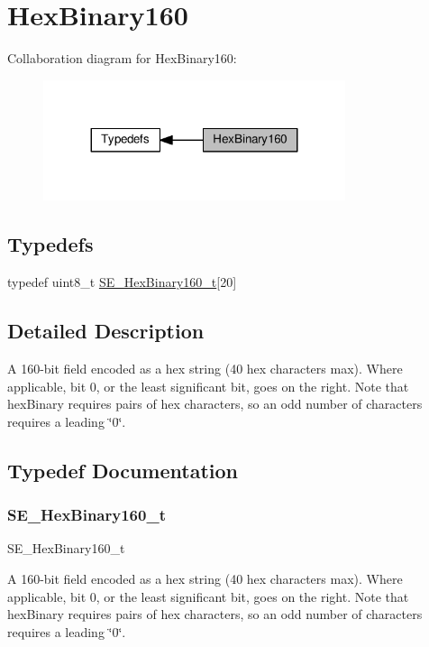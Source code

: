 \hypertarget{group__HexBinary160}{}\section{Hex\+Binary160}
\label{group__HexBinary160}
Collaboration diagram for Hex\+Binary160\+:\nopagebreak
\begin{figure}[H]
\begin{center}
\leavevmode
\includegraphics[width=251pt]{group__HexBinary160}
\end{center}
\end{figure}
\subsection*{Typedefs}
\begin{DoxyCompactItemize}
\item 
typedef uint8\+\_\+t \hyperlink{group__HexBinary160_ga92b92aa55555bdb75f3a59060f2c1632}{S\+E\+\_\+\+Hex\+Binary160\+\_\+t}\mbox{[}20\mbox{]}
\end{DoxyCompactItemize}


\subsection{Detailed Description}
A 160-\/bit field encoded as a hex string (40 hex characters max). Where applicable, bit 0, or the least significant bit, goes on the right. Note that hex\+Binary requires pairs of hex characters, so an odd number of characters requires a leading \char`\"{}0\char`\"{}. 

\subsection{Typedef Documentation}
\mbox{\label{group__HexBinary160_ga92b92aa55555bdb75f3a59060f2c1632}} 
\subsubsection{\texorpdfstring{S\+E\+\_\+\+Hex\+Binary160\+\_\+t}{SE\_HexBinary160\_t}}
{\footnotesize\ttfamily S\+E\+\_\+\+Hex\+Binary160\+\_\+t}

A 160-\/bit field encoded as a hex string (40 hex characters max). Where applicable, bit 0, or the least significant bit, goes on the right. Note that hex\+Binary requires pairs of hex characters, so an odd number of characters requires a leading \char`\"{}0\char`\"{}. 